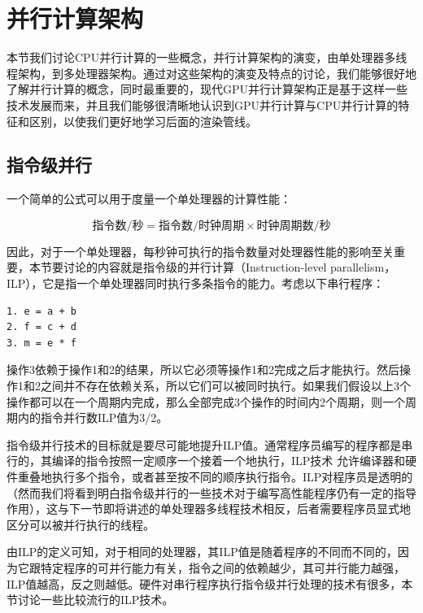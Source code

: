 \section{并行计算架构}
本节我们讨论CPU并行计算的一些概念，并行计算架构的演变，由单处理器多线程架构，到多处理器架构。通过对这些架构的演变及特点的讨论，我们能够很好地了解并行计算的概念，同时最重要的，现代GPU并行计算架构正是基于这样一些技术发展而来，并且我们能够很清晰地认识到GPU并行计算与CPU并行计算的特征和区别，以使我们更好地学习后面的渲染管线。




\subsection{指令级并行}
一个简单的公式可以用于度量一个单处理器的计算性能：

\begin{equation}
	\text{指令数}/\text{秒}=\text{指令数}/\text{时钟周期}\times \text{时钟周期数}/\text{秒}
\end{equation}

\noindent 因此，对于一个单处理器，每秒钟可执行的指令数量对处理器性能的影响至关重要，本节要讨论的内容就是指令级的并行计算（Instruction-level parallelism，ILP），它是指一个单处理器同时执行多条指令的能力。考虑以下串行程序：

\begin{lstlisting}
1. e = a + b
2. f = c + d
3. m = e * f
\end{lstlisting}

操作3依赖于操作1和2的结果，所以它必须等操作1和2完成之后才能执行。然后操作1和2之间并不存在依赖关系，所以它们可以被同时执行。如果我们假设以上3个操作都可以在一个周期内完成，那么全部完成3个操作的时间内2个周期，则一个周期内的指令并行数ILP值为3/2。

指令级并行技术的目标就是要尽可能地提升ILP值。通常程序员编写的程序都是串行的，其编译的指令按照一定顺序一个接着一个地执行，ILP技术 允许编译器和硬件重叠地执行多个指令，或者甚至按不同的顺序执行指令。ILP对程序员是透明的（然而我们将看到明白指令级并行的一些技术对于编写高性能程序仍有一定的指导作用），这与下一节即将讲述的单处理器多线程技术相反，后者需要程序员显式地区分可以被并行执行的线程。

由ILP的定义可知，对于相同的处理器，其ILP值是随着程序的不同而不同的，因为它跟特定程序的可并行能力有关，指令之间的依赖越少，其可并行能力越强，ILP值越高，反之则越低。硬件对串行程序执行指令级并行处理的技术有很多，本节讨论一些比较流行的ILP技术。





